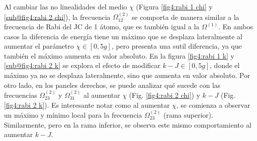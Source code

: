 
Al cambiar las no linealidades del medio $\chi$ (Figura \ref{fig4:rabi 1 chi} y \ref{sub@fig4:rabi 2 chi}), la frecuencia $\Omega^{(2)}_{12}$ se comporta de manera similar a la frecuencia de Rabi del JC de 1 átomo, que es también igual a la $\Omega^{(1)}$. En ambos casos la diferencia de energía tiene un máximo que se desplaza lateralmente al aumentar el parámetro $\chi\in[0,5g]$, pero presenta una sutil diferencia, ya que también el máximo aumenta en valor absoluto. En la figura \ref{fig4:rabi 1 k} y \ref{sub@fig4:rabi 2 k} se explora el efecto de modificar $k-J\in [0,5g]$, donde el máximo ya no se desplaza lateralmente, sino que aumenta en valor absoluto. Por otro lado, en los paneles derechos, se puede analizar qué sucede con las frecuencias $\Omega^{(2)}_{23}$ y $\Omega^{(2)}_{31}$ al aumentar $\chi$ (Fig. \ref{fig4:rabi 2 chi}) y $k-J$ (Fig. \ref{fig4:rabi 2 k}). Es interesante notar como al aumentar $\chi$, se comienza a observar un máximo y mínimo local para la frecuencia $\Omega^{(2)}_{23}$ (rama superior). Similarmente, pero en la rama inferior, se observa este mismo comportamiento al aumentar $k-J$.


